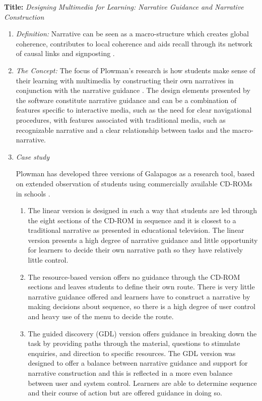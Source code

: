 \documentclass{egpubl}
\begin{document}
\textbf{Title:} \textit{Designing Multimedia for Learning: Narrative Guidance and Narrative Construction }
\begin{enumerate}
\item \textit{Definition:} Narrative can be seen as a macro-structure which creates global coherence, contributes to local
coherence and aids recall through its network of causal links and signposting \cite{plowman1999}. 
\item \textit{The Concept:} The focus of Plowman's research is how students make sense of their learning with multimedia by constructing their own narratives in conjunction with the narrative guidance \cite{plowman1999}. The design elements presented by the software constitute
narrative guidance and can be a combination of features specific to interactive media, such as the need for clear navigational procedures, with features associated with traditional media, such as recognizable narrative and a clear relationship between tasks and the macro-narrative. 

\item \textit{Case study}

Plowman has developed three versions of Galapagos as a research tool, based on extended observation of students using commercially available CD-ROMs in schools \cite{plowman1999}.
\begin{enumerate}
\item The linear version is designed in such a way that students are led through the eight sections of the CD-ROM in sequence and it is closest to a traditional narrative as presented in educational television.  The linear version presents a high degree of narrative guidance and little opportunity for learners to decide their own narrative path so they have relatively little control.
\item The resource-based version offers no guidance through the CD-ROM sections and leaves students to define their own route. There is very
little narrative guidance offered and learners have to construct a narrative by making decisions about sequence, so there is a high degree of user control and heavy use of the menu to decide the route. 
\item The guided discovery (GDL) version offers guidance in breaking down the task by providing paths through the material, questions to stimulate enquiries, and direction to specific resources. The GDL version was designed to offer a balance between narrative guidance and support for narrative construction and this is reflected in a more even balance between user and system control. Learners are able to determine sequence and their course of action but are offered guidance in doing so. 

\end{enumerate}
\end{enumerate}
\end{document}
